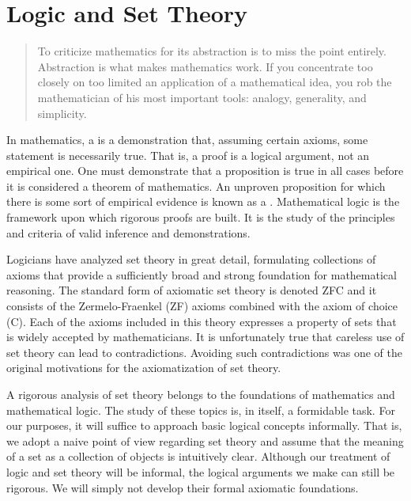 \chapter{Logic and Set Theory}


\begin{quote}
To criticize mathematics for its abstraction is to miss the point entirely.
Abstraction is what makes mathematics work.
If you concentrate too closely on too limited an application of a mathematical idea, you rob the mathematician of his most important tools: analogy, generality, and simplicity.
\end{quote}


In mathematics, a  is a demonstration that, assuming certain axioms, some statement is necessarily true.
That is, a proof is a logical argument, not an empirical one.
One must demonstrate that a proposition is true in all cases before it is considered a theorem of mathematics.
An unproven proposition for which there is some sort of empirical evidence is known as a .
Mathematical logic is the framework upon which rigorous proofs are built.
It is the study of the principles and criteria of valid inference and demonstrations.

Logicians have analyzed set theory in great detail, formulating collections of axioms that provide a sufficiently broad and strong foundation for mathematical reasoning.
The standard form of axiomatic set theory is denoted ZFC and it consists of the Zermelo-Fraenkel (ZF) axioms combined with the axiom of choice (C).
Each of the axioms included in this theory expresses a property of sets that is widely accepted by mathematicians.
It is unfortunately true that careless use of set theory can lead to contradictions.
Avoiding such contradictions was one of the original motivations for the axiomatization of set theory.

A rigorous analysis of set theory belongs to the foundations of mathematics and mathematical logic.
The study of these topics is, in itself, a formidable task.
For our purposes, it will suffice to approach basic logical concepts informally.
That is, we adopt a naive point of view regarding set theory and assume that the meaning of a set as a collection of objects is intuitively clear.
Although our treatment of logic and set theory will be informal, the logical arguments we make can still be rigorous.
We will simply not develop their formal axiomatic foundations.


